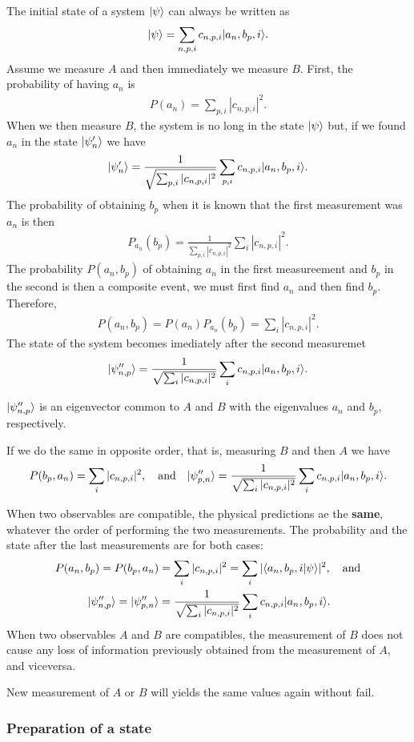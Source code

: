 The initial state of a system $|\psi\rangle$ can always be written as
\begin{align*}
    |\psi\rangle=\sum_{n,p,i}c_{n,p,i}|a_n,b_p,i\rangle.
\end{align*}
Assume we measure $A$ and then immediately we measure $B$. First, the probability of having $a_n$ is 
\begin{align}
    P(a_n)=\sum_{p,i}|c_{n,p,i}|^2.
\end{align}
When we then measure $B$, the system is no long in the state $|\psi\rangle$ but, if we found $a_n$ in the state $|\psi'_n\rangle$ we have 
\begin{align*}
    |\psi_n'\rangle=\frac{1}{\sqrt{\sum_{p,i}|c_{n,p,i}|^2}}\sum_{p,i}c_{n,p,i}|a_n,b_p,i\rangle.
\end{align*}
The probability of obtaining $b_p$ when it is known that the first measurement was $a_n$ is then
\begin{align}
    P_{a_n}(b_p)=\frac{1}{\sum_{p,i}|c_{n,p,i}|^2}\sum_i|c_{n,p,i}|^2.
\end{align}
The probability $P(a_n,b_p)$ of obtaining $a_n$ in the first measureement and $b_p$ in the second is then a composite event, we must first find $a_n$ and then find $b_p$.
Therefore,
\begin{align}
    P(a_n,b_p)=P(a_n)P_{a_n}(b_p)=\sum_i|c_{n,p,i}|^2.
\end{align}
The state of the system becomes imediately after the second measuremet 
\begin{align}
    |\psi''_{n,p}\rangle=\frac{1}{\sqrt{\sum_{i}|c_{n,p,i}|^2}}\sum_ic_{n,p,i}|a_n,b_p,i\rangle.
\end{align}
\begin{emphasizer}
    $|\psi''_{n,p}\rangle$ is an eigenvector common to $A$ and $B$ with the eigenvalues $a_n$ and $b_p$, respectively.
\end{emphasizer}
If we do the same in opposite order, that is, measuring $B$ and then $A$ we have 
\begin{align}
    P(b_p,a_n)=\sum_i|c_{n,p,i}|^2,\quad\text{and}\quad|\psi''_{p,n}\rangle=\frac{1}{\sqrt{\sum_i|c_{n,p,i}|^2}}\sum_ic_{n,p,i}|a_n,b_p,i\rangle.
\end{align}

\begin{emphasizer}
    When two observables are compatible, the physical predictions ae the \textbf{same}, whatever the order of performing the two measurements.
    The probability and the state after the last measurements are for both cases:
    \begin{align}
        P(a_n,b_p)=P(b_p,a_n)&=\sum_i|c_{n,p,i}|^2=\sum_i|\langle a_n,b_p,i|\psi\rangle|^2,\quad\text{and}\\
        |\psi''_{n,p}\rangle=|\psi''_{p,n}\rangle&=\frac{1}{\sqrt{\sum_i|c_{n,p,i}|^2}}\sum_ic_{n,p,i}|a_n,b_p,i\rangle.
    \end{align}
    When two observables $A$ and $B$ are compatibles, the measurement of $B$ does not cause any loss of information previously obtained from the measurement 
    of $A$, and viceversa.
\end{emphasizer}
New measurement of $A$ or $B$ will yields the same values again without fail.

\subsubsection{Preparation of a state}